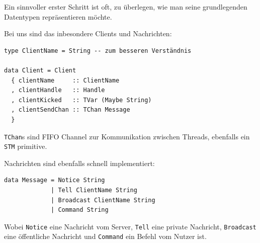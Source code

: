 \documentclass{beamer}
\begin{document}

\begin{frame}[fragile]

Ein sinnvoller erster Schritt ist oft, zu überlegen, wie man seine grundlegenden Datentypen
repräsentieren möchte.\smallskip\smallskip

Bei uns sind das inbesondere Clients und Nachrichten:\pause\smallskip\smallskip

\begin{verbatim}
type ClientName = String -- zum besseren Verständnis

data Client = Client
  { clientName     :: ClientName
  , clientHandle   :: Handle
  , clientKicked   :: TVar (Maybe String)
  , clientSendChan :: TChan Message
  }
\end{verbatim}
\pause
\texttt{TChan}s sind FIFO Channel zur Kommunikation zwischen Threads, ebenfalls ein \texttt{STM} primitive.
\end{frame}


\begin{frame}[fragile] 

Nachrichten sind ebenfalls schnell implementiert:\pause

\begin{verbatim}
data Message = Notice String
             | Tell ClientName String
             | Broadcast ClientName String
             | Command String
\end{verbatim}

Wobei \texttt{Notice} eine Nachricht vom Server, \texttt{Tell} eine private Nachricht, \texttt{Broadcast} eine
öffentliche Nachricht und \texttt{Command} ein Befehl vom Nutzer ist.
\end{frame}

\end{document}
